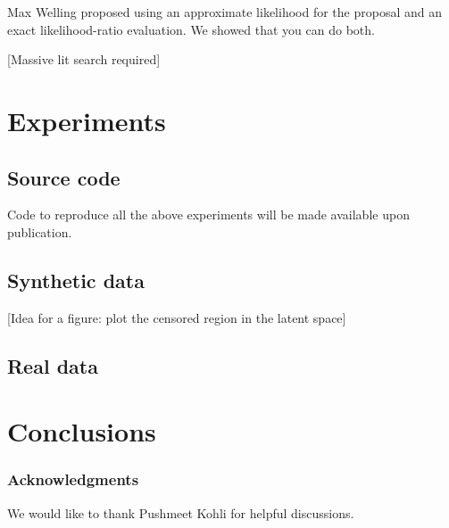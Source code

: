 \documentclass{article}
\begin{document}
Max Welling proposed using an approximate likelihood for the proposal and an exact likelihood-ratio evaluation.  We showed that you can do both.

[Massive lit search required]


\section{Experiments}

\subsection{Source code}

Code to reproduce all the above experiments will be made available upon publication.


\subsection{Synthetic data}



[Idea for a figure: plot the censored region in the latent space]

\subsection{Real data}



\section{Conclusions}

\subsubsection*{Acknowledgments}

We would like to thank Pushmeet Kohli for helpful discussions.



\end{document}
